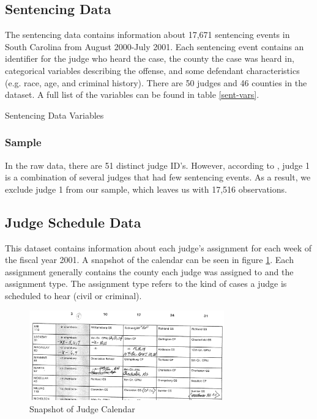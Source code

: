 \documentclass[11pt]{article}
\theoremstyle{ModifiedStyle}
\theoremstyle{ModifiedStyle}
\begin{document}
  \subsection{Sentencing Data}
    The sentencing data contains information about 17,671 sentencing events in South Carolina from August 2000-July 2001. Each sentencing event contains an identifier for the judge who heard the case, the county the case was heard in, categorical variables describing the offense, and some defendant characteristics (e.g. race, age, and criminal history). There are 50 judges and 46 counties in the dataset. A full list of the variables can be found in table \ref{sent-vars}.
    \begin{table}[H]
      \caption{Sentencing Data Variables}
      \label{sent-vars}
      
    \end{table}

    \subsubsection{Sample}
      In the raw data, there are 51 distinct judge ID's. However, according to \cite{hester2017conditional}, judge 1 is a combination of several judges that had few sentencing events. As a result, we exclude judge 1 from our sample, which leaves us with 17,516 observations.

  \subsection{Judge Schedule Data}
    This dataset contains information about each judge's assignment for each week of the fiscal year 2001. A snapshot of the calendar can be seen in figure \ref{fig-calendar}. Each assignment generally contains the county each judge was assigned to and the assignment type. The assignment type refers to the kind of cases a judge is scheduled to hear (civil or criminal).
    \begin{figure}[h]
        \centering
        \caption{Snapshot of Judge Calendar}
        \label{fig-calendar}
        \includegraphics[width=0.75\textwidth, keepaspectratio=true]{Figures/Fig4.png}
      \end{figure}
\end{document}
